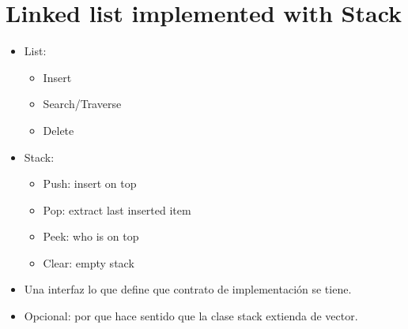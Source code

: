 \section{Linked list implemented with Stack}
\begin{itemize}
    \item List:
        \begin{itemize}
            \item Insert 
            \item Search/Traverse 
            \item Delete 
        \end{itemize}
    
    \item Stack:
        \begin{itemize}
            \item Push: insert on top 
            \item Pop: extract last inserted item 
            \item Peek: who is on top 
            \item Clear: empty stack
        \end{itemize}
    
    \item Una interfaz lo que define que contrato de implementación se tiene.
    \item Opcional: por que hace sentido que la clase stack extienda de vector.
\end{itemize}
